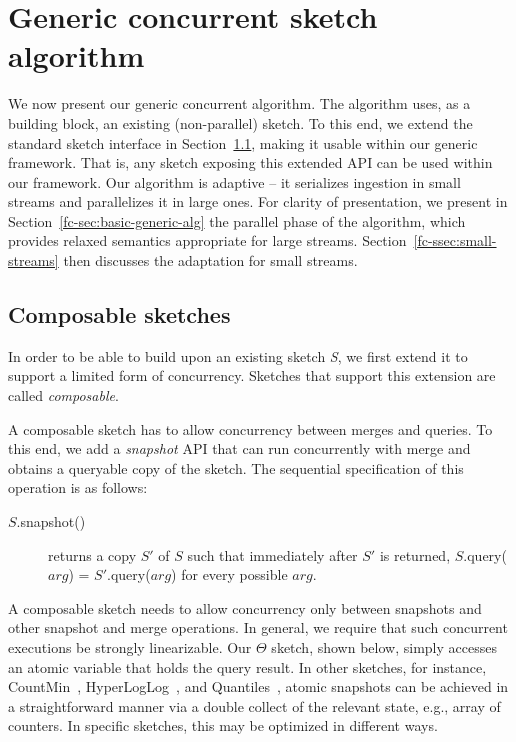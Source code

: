 \section{Generic concurrent sketch algorithm}
\label{fc-sec:genericAlg}

We now present our generic concurrent  algorithm. 
The algorithm uses, as a building block, an existing (non-parallel) sketch. 
To this end, we extend the standard sketch interface in Section~\ref{fc-sec:composable-sketches}, 
making it usable within our generic framework. That is, any sketch exposing this extended API can be used within our framework.
Our algorithm is adaptive -- it serializes ingestion in small streams and parallelizes it in large ones.
For clarity of presentation, we  present in Section~\ref{fc-sec:basic-generic-alg} the parallel phase of the algorithm,
which provides relaxed semantics appropriate for large streams.  
Section~\ref{fc-ssec:small-streams} then discusses the adaptation for small streams.


\subsection{Composable sketches}
\label{fc-sec:composable-sketches}

In order to be able to build upon an existing sketch \emph{S},
we first extend it to support a limited form of concurrency.
Sketches that support this extension are called \emph{composable}.

A composable sketch has to allow concurrency between merges and queries.
To this end, we add a \emph{snapshot} API that can run concurrently with merge and
obtains a queryable copy of the sketch. The sequential specification of this operation is as follows:
\begin{description}
    \item[$S$.snapshot()] returns a copy $S'$ of $S$ such that immediately after $S'$ is returned,
     $S$.query($arg$) = $S'$.query($arg$) for every possible $arg$.
\end{description}

A composable sketch needs to allow concurrency only between snapshots
and other snapshot and merge operations. In general, we require that such concurrent
executions be strongly linearizable. Our $\Theta$ sketch, shown below,
simply accesses an atomic variable that holds the query result. In other sketches, for instance, 
CountMin~\cite{CountMin}, HyperLogLog~\cite{Flajolet07hyperloglog,heule2013hyperloglog,druid,PrestoHLL}, and Quantiles~\cite{KLL:2016}, atomic
snapshots can be achieved in a straightforward manner via a double collect of the relevant state, e.g., array of counters.
In specific sketches, this may be optimized in different ways. 

